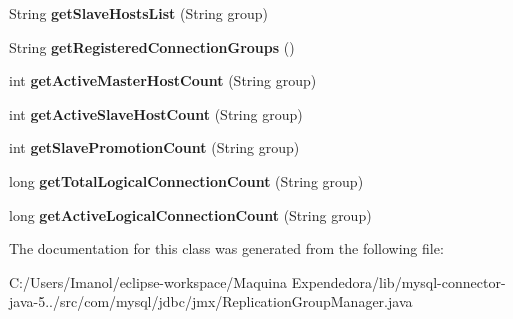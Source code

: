 \begin{DoxyCompactItemize}
String {\bfseries get\+Slave\+Hosts\+List} (String group)
\item 
\mbox{\label{classcom_1_1mysql_1_1jdbc_1_1jmx_1_1_replication_group_manager_a06087f76eb915e88f8fe7c53ecdcc7df}} 
String {\bfseries get\+Registered\+Connection\+Groups} ()
\item 
\mbox{\label{classcom_1_1mysql_1_1jdbc_1_1jmx_1_1_replication_group_manager_ae97c6c24850381dc0c85c39cd99779d0}} 
int {\bfseries get\+Active\+Master\+Host\+Count} (String group)
\item 
\mbox{\label{classcom_1_1mysql_1_1jdbc_1_1jmx_1_1_replication_group_manager_a5de491ed2f84545d315a82d7d9125624}} 
int {\bfseries get\+Active\+Slave\+Host\+Count} (String group)
\item 
\mbox{\label{classcom_1_1mysql_1_1jdbc_1_1jmx_1_1_replication_group_manager_a0048d8f47fddd448f3ce607b56d01688}} 
int {\bfseries get\+Slave\+Promotion\+Count} (String group)
\item 
\mbox{\label{classcom_1_1mysql_1_1jdbc_1_1jmx_1_1_replication_group_manager_ab267f58b49b2b184c3c49d2f2c624422}} 
long {\bfseries get\+Total\+Logical\+Connection\+Count} (String group)
\item 
\mbox{\label{classcom_1_1mysql_1_1jdbc_1_1jmx_1_1_replication_group_manager_ab4e5d5b2ccd1a31fc69e9073862d58c0}} 
long {\bfseries get\+Active\+Logical\+Connection\+Count} (String group)
\end{DoxyCompactItemize}


The documentation for this class was generated from the following file\+:\begin{DoxyCompactItemize}
\item 
C\+:/\+Users/\+Imanol/eclipse-\/workspace/\+Maquina Expendedora/lib/mysql-\/connector-\/java-\/5../src/com/mysql/jdbc/jmx/Replication\+Group\+Manager.\+java\end{DoxyCompactItemize}
